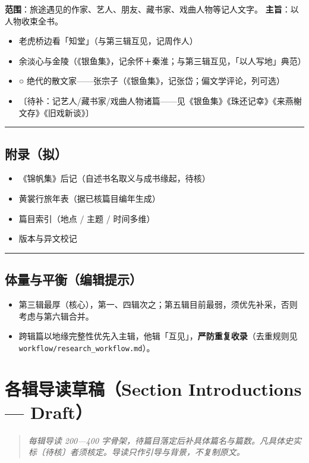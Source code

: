 \documentclass[UTF8,fontset=none,zihao=-4,a4paper]{ctexart}
\begin{document}
\textbf{范围}：旅途遇见的作家、艺人、朋友、藏书家、戏曲人物等记人文字。 \textbf{主旨}：以人物收束全书。


\begin{itemize}
\item 老虎桥边看「知堂」（与第三辑互见，记周作人）
\item 余淡心与金陵（《银鱼集》，记余怀＋秦淮；与第三辑互见，「以人写地」典范）
\item ○ 绝代的散文家——张宗子（《银鱼集》，记张岱；偏文学评论，列可选）
\item 〔待补：记艺人/藏书家/戏曲人物诸篇——见《银鱼集》《珠还记幸》《来燕榭文存》《旧戏新谈》〕
\end{itemize}


\medskip\hrule\medskip

\subsection{附录（拟）}

\begin{itemize}
\item 《锦帆集》后记（自述书名取义与成书缘起，待核）
\item 黄裳行旅年表（据已核篇目编年生成）
\item 篇目索引（地点 / 主题 / 时间多维）
\item 版本与异文校记
\end{itemize}


\medskip\hrule\medskip

\subsection{体量与平衡（编辑提示）}

\begin{itemize}
\item 第三辑最厚（核心），第一、四辑次之；第五辑目前最弱，须优先补采，否则考虑与第六辑合并。
\item 跨辑篇以地缘完整性优先入主辑，他辑「互见」，\textbf{严防重复收录}（去重规则见 \texttt{workflow/research\_workflow.md}）。
\end{itemize}


\section{各辑导读草稿（Section Introductions — Draft）}


\begin{quote}\small\itshape
每辑导读 200—400 字骨架，待篇目落定后补具体篇名与篇数。凡具体史实标〔待核〕者须核定。导读只作引导与背景，不复制原文。
\end{quote}
\end{document}

